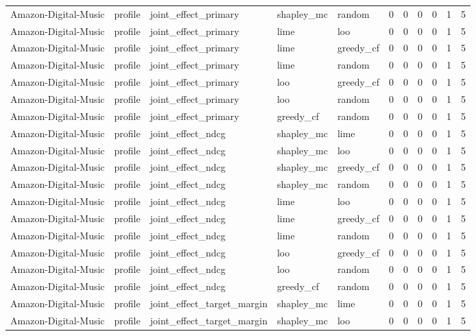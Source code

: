 \begin{table}[t]
{\begin{tabular}{lllllrrrrrr}
Amazon-Digital-Music & profile & joint\_effect\_primary & shapley\_mc & random & 0 & 0 & 0 & 0 & 1 & 5 \\
Amazon-Digital-Music & profile & joint\_effect\_primary & lime & loo & 0 & 0 & 0 & 0 & 1 & 5 \\
Amazon-Digital-Music & profile & joint\_effect\_primary & lime & greedy\_cf & 0 & 0 & 0 & 0 & 1 & 5 \\
Amazon-Digital-Music & profile & joint\_effect\_primary & lime & random & 0 & 0 & 0 & 0 & 1 & 5 \\
Amazon-Digital-Music & profile & joint\_effect\_primary & loo & greedy\_cf & 0 & 0 & 0 & 0 & 1 & 5 \\
Amazon-Digital-Music & profile & joint\_effect\_primary & loo & random & 0 & 0 & 0 & 0 & 1 & 5 \\
Amazon-Digital-Music & profile & joint\_effect\_primary & greedy\_cf & random & 0 & 0 & 0 & 0 & 1 & 5 \\
Amazon-Digital-Music & profile & joint\_effect\_ndcg & shapley\_mc & lime & 0 & 0 & 0 & 0 & 1 & 5 \\
Amazon-Digital-Music & profile & joint\_effect\_ndcg & shapley\_mc & loo & 0 & 0 & 0 & 0 & 1 & 5 \\
Amazon-Digital-Music & profile & joint\_effect\_ndcg & shapley\_mc & greedy\_cf & 0 & 0 & 0 & 0 & 1 & 5 \\
Amazon-Digital-Music & profile & joint\_effect\_ndcg & shapley\_mc & random & 0 & 0 & 0 & 0 & 1 & 5 \\
Amazon-Digital-Music & profile & joint\_effect\_ndcg & lime & loo & 0 & 0 & 0 & 0 & 1 & 5 \\
Amazon-Digital-Music & profile & joint\_effect\_ndcg & lime & greedy\_cf & 0 & 0 & 0 & 0 & 1 & 5 \\
Amazon-Digital-Music & profile & joint\_effect\_ndcg & lime & random & 0 & 0 & 0 & 0 & 1 & 5 \\
Amazon-Digital-Music & profile & joint\_effect\_ndcg & loo & greedy\_cf & 0 & 0 & 0 & 0 & 1 & 5 \\
Amazon-Digital-Music & profile & joint\_effect\_ndcg & loo & random & 0 & 0 & 0 & 0 & 1 & 5 \\
Amazon-Digital-Music & profile & joint\_effect\_ndcg & greedy\_cf & random & 0 & 0 & 0 & 0 & 1 & 5 \\
Amazon-Digital-Music & profile & joint\_effect\_target\_margin & shapley\_mc & lime & 0 & 0 & 0 & 0 & 1 & 5 \\
Amazon-Digital-Music & profile & joint\_effect\_target\_margin & shapley\_mc & loo & 0 & 0 & 0 & 0 & 1 & 5 \\

\end{tabular}}
\end{table}
